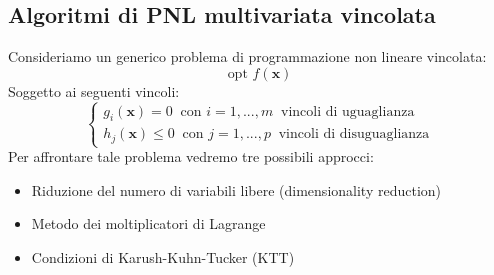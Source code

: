 \documentclass[12pt]{article}
\begin{document}
\subsection{Algoritmi di PNL multivariata vincolata}
Consideriamo un generico problema di programmazione non lineare vincolata:
$$\textrm{opt } f(\boldsymbol{x})$$
Soggetto ai seguenti vincoli:
$$\begin{cases}
    g_i(\boldsymbol{x}) = 0 \; \; \textrm{con } i = 1,...,m \; \;  \textrm{vincoli di uguaglianza} \\
    h_j(\boldsymbol{x}) \leq 0 \; \;  \textrm{con } j = 1,...,p \; \;  \textrm{vincoli di disuguaglianza}
\end{cases}$$
Per affrontare tale problema vedremo tre possibili approcci:
\begin{itemize}
    \item Riduzione del numero di variabili libere (dimensionality reduction)
    \item Metodo dei moltiplicatori di Lagrange
    \item Condizioni di Karush-Kuhn-Tucker (KTT)
\end{itemize}
\end{document}
